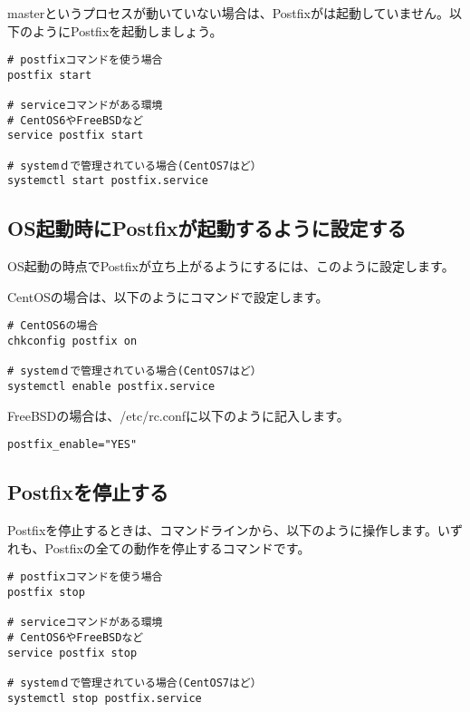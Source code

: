 masterというプロセスが動いていない場合は、Postfixがは起動していません。以下のようにPostfixを起動しましょう。

\begin{lstlisting}[basicstyle=\ttfamily\footnotesize, frame=single]
# postfixコマンドを使う場合
postfix start

# serviceコマンドがある環境
# CentOS6やFreeBSDなど
service postfix start

# systemｄで管理されている場合(CentOS7はど）
systemctl start postfix.service
\end{lstlisting}

\subsection{OS起動時にPostfixが起動するように設定する}

OS起動の時点でPostfixが立ち上がるようにするには、このように設定します。

CentOSの場合は、以下のようにコマンドで設定します。

\begin{lstlisting}[basicstyle=\ttfamily\footnotesize, frame=single]
# CentOS6の場合
chkconfig postfix on

# systemｄで管理されている場合(CentOS7はど）
systemctl enable postfix.service
\end{lstlisting}

FreeBSDの場合は、/etc/rc.confに以下のように記入します。

\begin{lstlisting}[basicstyle=\ttfamily\footnotesize, frame=single]
postfix_enable="YES"
\end{lstlisting}

\subsection{Postfixを停止する}
Postfixを停止するときは、コマンドラインから、以下のように操作します。いずれも、Postfixの全ての動作を停止するコマンドです。

\begin{lstlisting}[basicstyle=\ttfamily\footnotesize, frame=single]
# postfixコマンドを使う場合
postfix stop

# serviceコマンドがある環境
# CentOS6やFreeBSDなど
service postfix stop

# systemｄで管理されている場合(CentOS7はど）
systemctl stop postfix.service
\end{lstlisting}



